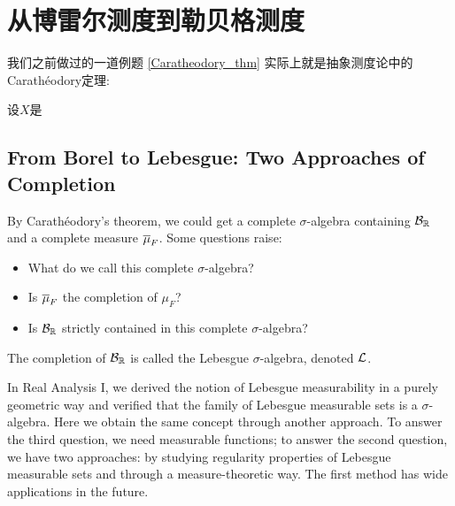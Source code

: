 \section{从博雷尔测度到勒贝格测度}
我们之前做过的一道例题 \ref{Caratheodory_thm} 实际上就是抽象测度论中的Carath\'eodory定理:
\begin{theorem}
    设$X$是
\end{theorem}




\subsection{From Borel to Lebesgue: Two Approaches of Completion}
By Carath\'eodory's theorem, we could get a complete $\sigma$-algebra containing $\mathcal{B}_{\mathbb{R}}$ and a complete measure $\overline{\mu}_F$. Some questions raise:
\begin{itemize}
    \item What do we call this complete $\sigma$-algebra?
    \item Is $\overline{\mu}_F$ the completion of $\mu_F$?
    \item Is $\mathcal{B}_{\mathbb{R}}$ strictly contained in this complete $\sigma$-algebra?
\end{itemize}
\begin{definition}
    The completion of $\mathcal{B}_{\mathbb{R}}$ is called the Lebesgue $\sigma$-algebra, denoted $\mathcal{L}$. 
\end{definition}
In Real Analysis I, we derived the notion of Lebesgue measurability in a purely geometric way and verified that the family of Lebesgue measurable sets is a $\sigma$-algebra. 
Here we obtain the same concept through another approach. 
To answer the third question, we need measurable functions; to answer the second question, we have two approaches: by studying regularity properties of Lebesgue measurable sets and through a measure-theoretic way. 
The first method has wide applications in the future. 
